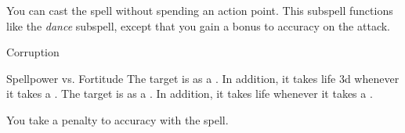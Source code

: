 You can cast the spell without spending an action point.
This subspell functions like the \textit{dance} subspell, except that you gain a  bonus to accuracy on the attack.
\begin{spellsection}{Corruption}
\begin{spellheader}
\end{spellheader}
\begin{spellcontent}
\begin{spelltargetinginfo}
\end{spelltargetinginfo}
\begin{spelleffects}
\begin{spellattack}{Spellpower vs. Fortitude}
\spellsuccess
The target is  as a .
In addition, it takes life  \minus3d whenever it takes a .
\spellcritical
The target is  as a .
In addition, it takes life  whenever it takes a .
\end{spellattack}
\end{spelleffects}
\end{spellcontent}
\begin{spellfooter}
\end{spellfooter}
\begin{spellsubcontent}
\begin{spellcantrip}
You take a  penalty to accuracy with the spell.
\end{spellcantrip}
\end{spellsubcontent}
\end{spellsection}
